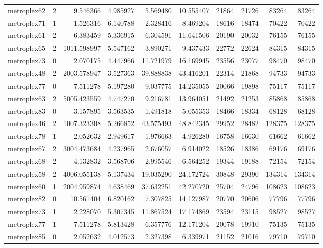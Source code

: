 \begin{longtable}{|l|r|r|r|r|r|r|r|r|r|}
metroplex62 & 2 & 9.546366 & 4.985927 & 5.569480 & 10.555407 & 21864 & 21726 & 83264 & 83264 \\
metroplex71 & 1 & 1.526316 & 6.140788 & 2.328416 & 8.469204 & 18616 & 18474 & 70422 & 70422 \\
metroplex61 & 2 & 6.383459 & 5.336915 & 6.304591 & 11.641506 & 20190 & 20032 & 76155 & 76155 \\
metroplex65 & 2 & 1011.598997 & 5.547162 & 3.890271 & 9.437433 & 22772 & 22624 & 84315 & 84315 \\
metroplex73 & 0 & 2.070175 & 4.447966 & 11.721979 & 16.169945 & 23556 & 23077 & 98470 & 98470 \\
metroplex48 & 2 & 2003.578947 & 3.527363 & 39.888838 & 43.416201 & 22314 & 21868 & 94733 & 94733 \\
metroplex77 & 0 & 7.511278 & 5.197280 & 9.037775 & 14.235055 & 20066 & 19898 & 75117 & 75117 \\
metroplex63 & 2 & 5005.423559 & 4.747270 & 9.216781 & 13.964051 & 21492 & 21253 & 85868 & 85868 \\
metroplex83 & 0 & 3.157895 & 3.563535 & 1.491818 & 5.055353 & 18466 & 18334 & 68128 & 68128 \\
metroplex46 & 2 & 1007.323308 & 5.266852 & 43.575493 & 48.842345 & 29952 & 28482 & 128375 & 128375 \\
metroplex78 & 1 & 2.052632 & 2.949617 & 1.976663 & 4.926280 & 16758 & 16630 & 61662 & 61662 \\
metroplex67 & 2 & 3004.473684 & 4.237965 & 2.676057 & 6.914022 & 18526 & 18386 & 69176 & 69176 \\
metroplex68 & 2 & 4.132832 & 3.568706 & 2.995546 & 6.564252 & 19344 & 19188 & 72154 & 72154 \\
metroplex58 & 2 & 4006.055138 & 5.137434 & 19.035290 & 24.172724 & 30848 & 29390 & 134314 & 134314 \\
metroplex60 & 1 & 2004.959874 & 4.638469 & 37.632251 & 42.270720 & 25704 & 24796 & 108623 & 108623 \\
metroplex82 & 0 & 10.561404 & 6.820162 & 7.307825 & 14.127987 & 20770 & 20606 & 77796 & 77796 \\
metroplex73 & 1 & 2.228070 & 5.307345 & 11.867524 & 17.174869 & 23594 & 23115 & 98527 & 98527 \\
metroplex77 & 1 & 7.511278 & 5.813428 & 6.357776 & 12.171204 & 20078 & 19910 & 75135 & 75135 \\
metroplex85 & 0 & 2.052632 & 4.012573 & 2.327398 & 6.339971 & 21152 & 21016 & 79710 & 79710 \\

\end{longtable}
